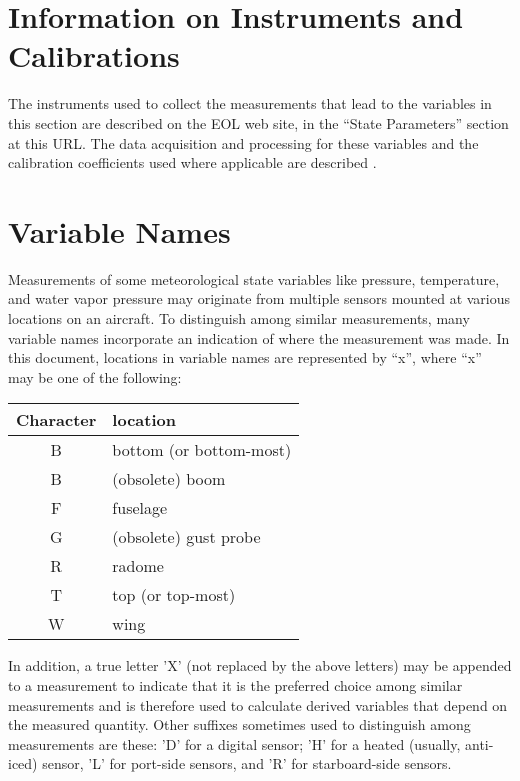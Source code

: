 \documentclass[
  english,
]{book}
\begin{document}
\hypertarget{information-on-instruments-and-calibrations}{%
\section{Information on Instruments and Calibrations}\label{information-on-instruments-and-calibrations}}

The instruments used to collect the measurements that lead to the variables in this section are described on the EOL web site, in the ``State Parameters'' section at this URL. The data acquisition and processing for these variables and the calibration coefficients used where applicable are described .

\hypertarget{variable-names}{%
\section{Variable Names}\label{variable-names}}

Measurements of some meteorological state variables like pressure, temperature, and water vapor pressure may originate from multiple sensors mounted at various locations on an aircraft. To distinguish among similar measurements, many variable names incorporate an indication of where the measurement was made. In this document, locations in variable names are represented by ``x'', where ``x'' may be one of the following:

\begin{table}
\centering
\begin{tabular}{c|l}
\hline
Character & location\\
\hline
B & bottom (or bottom-most)\\
\hline
B & (obsolete) boom\\
\hline
F & fuselage\\
\hline
G & (obsolete) gust probe\\
\hline
R & radome\\
\hline
T & top (or top-most)\\
\hline
W & wing\\
\hline
\end{tabular}
\end{table}

In addition, a true letter 'X' (not replaced by the above letters) may be appended to a measurement to indicate that it is the preferred choice among similar measurements and is therefore used to calculate derived variables that depend on the measured quantity. Other suffixes sometimes used to distinguish among measurements are these: 'D' for a digital sensor; 'H' for a heated (usually, anti-iced) sensor, 'L' for port-side sensors, and 'R' for starboard-side sensors.
\end{document}
